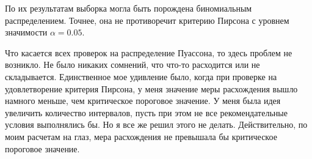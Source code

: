 \documentclass[14pt,a4paper]{scrartcl}
\theoremstyle{definition}
\theoremstyle{remark}
\theoremstyle{definition}
\theoremstyle{definition}
\begin{document}
По их результатам выборка могла быть порождена биномиальным распределением. Точнее, она не противоречит критерию Пирсона с уровнем значимости $\alpha = 0.05$.

Что касается всех проверок на распределение Пуассона, то здесь проблем не возникло. Не было никаких сомнений, что что-то расходится или не складывается. Единственное мое удивление было, когда при проверке на удовлетворение критерия Пирсона, у меня значение меры расхождения вышло намного меньше, чем критическое пороговое значение. У меня была идея увеличить количество интервалов, пусть при этом не все рекомендательные условия выполнялись бы. Но я все же решил этого не делать. Действительно, по моим расчетам на глаз, мера расхождения не превышала бы критическое пороговое значение.
\end{document}
